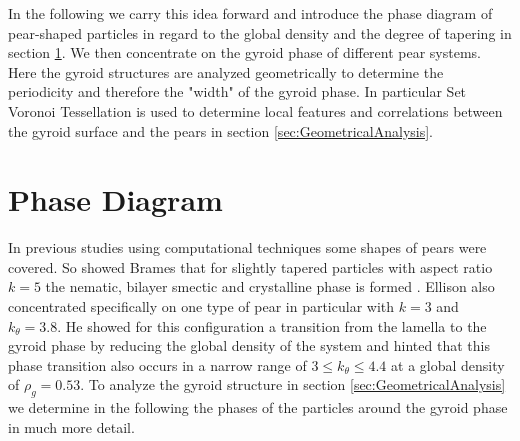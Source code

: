 \documentclass[epj,onecolumn]{webofc}
\begin{document}
In the following we carry this idea forward and introduce the phase diagram of pear-shaped particles in regard to the global density and the degree of tapering in section \ref{sec:PhaseDiagram}. We then concentrate on the 
gyroid phase of different pear systems. Here the gyroid structures are analyzed geometrically to determine the periodicity and therefore the "width" of the gyroid phase. In particular Set Voronoi Tessellation is used to determine 
local features and correlations between the gyroid surface and the pears in section \ref{sec:GeometricalAnalysis}.

%



\section{Phase Diagram}
\label{sec:PhaseDiagram}

In previous studies using computational techniques some shapes of pears were covered. So showed Brames that for slightly tapered particles with aspect ratio $k=5$ the nematic, bilayer smectic and crystalline phase is formed 
\cite{}. Ellison also concentrated specifically on one type of pear in particular with $k=3$ and $k_{\theta}=3.8$. He showed for this configuration a transition from the lamella to the gyroid phase by reducing the global density of 
the system and hinted that this phase transition also occurs in a narrow range of $3\leq k_{\theta}\leq 4.4$ at a global density of $\rho_g=0.53$. To analyze the gyroid structure in section \ref{sec:GeometricalAnalysis} we 
determine in the following the phases of the particles around the gyroid phase in much more detail.\\
\end{document}
